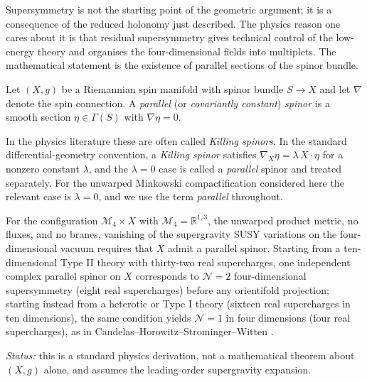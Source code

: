 Supersymmetry is not the starting point of the geometric argument; it
is a consequence of the reduced holonomy just described. The physics
reason one cares about it is that residual supersymmetry gives
technical control of the low-energy theory and organises the
four-dimensional fields into multiplets. The mathematical statement
is the existence of parallel sections of the spinor bundle.

\begin{definition}
Let $(X,g)$ be a Riemannian spin manifold with spinor bundle $S\to X$
and let $\nabla$ denote the spin connection. A \emph{parallel} (or
\emph{covariantly constant}) \emph{spinor} is a smooth section
$\eta\in\Gamma(S)$ with $\nabla \eta = 0$.
\end{definition}

\begin{remark}[Terminology]
In the physics literature these are often called \emph{Killing
spinors}. In the standard differential-geometry convention,
a \emph{Killing spinor} satisfies
$\nabla_X\eta = \lambda\, X\!\cdot\!\eta$ for a nonzero constant
$\lambda$, and the $\lambda=0$ case is called a \emph{parallel}
spinor and treated separately. For the unwarped Minkowski
compactification considered here the relevant case is $\lambda=0$,
and we use the term \emph{parallel} throughout.
\end{remark}

\begin{proposition}\label{thm:susy-parallel}
For the configuration $\mathcal{M}_4 \times X$ with
$\mathcal{M}_4 = \mathbb{R}^{1,3}$, the unwarped product metric,
no fluxes, and no branes, vanishing of the supergravity SUSY
variations on the four-dimensional vacuum requires that $X$ admit
a parallel spinor. Starting from a ten-dimensional Type II theory
with thirty-two real supercharges, one independent complex parallel
spinor on $X$ corresponds to $\mathcal{N}=2$ four-dimensional
supersymmetry (eight real supercharges) before any orientifold
projection; starting instead from a heterotic or Type I theory
(sixteen real supercharges in ten dimensions), the same condition
yields $\mathcal{N}=1$ in four dimensions (four real supercharges),
as in Candelas--Horowitz--Strominger--Witten
\cite{Candelas:1985en}.

\emph{Status:} this is a standard physics derivation, not a
mathematical theorem about $(X,g)$ alone, and assumes the
leading-order supergravity expansion.
\end{proposition}

